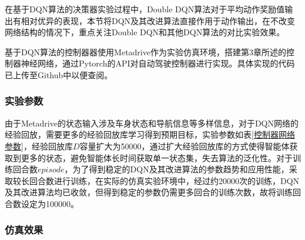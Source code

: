 在基于DQN算法的决策器实验过程中，Double DQN算法对于平均动作奖励值输出有相对优异的表现，本节将DQN及其改进算法直接作用于动作输出，在不改变网络结构的情况下，重点关注Double DQN和其他DQN算法的对比实验效果。

基于DQN算法的控制器器使用Metadrive作为实验仿真环境，搭建第3章所述的控制器神经网络，通过Pytorch的API对自动驾驶控制器进行实现。具体实现的代码已上传至Github中以便查阅\cite{metadrive-dqn}。

\subsubsection{实验参数}

\begin{table}[htbp]
    \caption{控制器网络参数}\label{控制器网络参数}
    \centering
    \renewcommand\arraystretch{1.5}
\end{table}

由于Metadrive的状态输入涉及车身状态和导航信息等多样信息，对于DQN网络的经验回放，需要更多的经验回放库学习得到预期目标，实验参数如表\ref{控制器网络参数}，经验回放库$D$容量扩大为50000，通过扩大经验回放库的方式使得智能体获取到更多的状态，避免智能体长时间获取单一状态集，失去算法的泛化性。对于训练回合数$episode$，为了得到稳定的DQN及其改进算法的参数趋势和应用性能，采取较长回合数进行训练，在实际的仿真实验环境中，经过约20000次的训练，DQN及其改进算法均已收敛，但得到稳定的参数仍需更多回合的训练次数，故将训练回合数设定为100000。

\newpage

\subsubsection{仿真效果}

